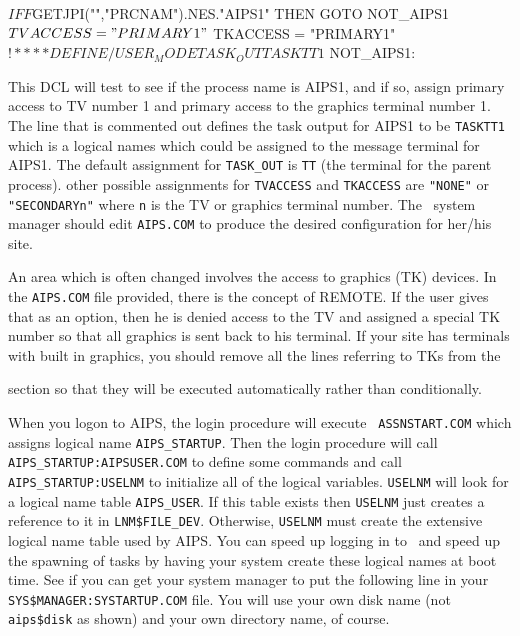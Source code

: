 \fortran
$ IF F$GETJPI("","PRCNAM").NES."AIPS1" THEN GOTO NOT_AIPS1
$     TVACCESS = "PRIMARY1"
$     TKACCESS = "PRIMARY1"
$!****     DEFINE/USER_MODE TASK_OUT TASKTT1
$ NOT_AIPS1:
\endfortran\medskip

\noindent
This DCL will test to see if the process name is AIPS1, and if so,
assign primary access to TV number 1 and primary access to the
graphics terminal number 1.  The line that is commented out defines
the task output for AIPS1 to be {\tt TASKTT1} which is a logical names
which could be assigned to the message terminal for AIPS1.  The
default assignment for {\tt TASK\_OUT} is {\tt TT} (the terminal for
the parent process). other possible assignments for {\tt TVACCESS} and
{\tt TKACCESS} are {\tt "NONE"} or {\tt "SECONDARYn"} where {\tt n} is
the TV or graphics terminal number.  The \aips\ system manager should
edit {\tt AIPS.COM} to produce the desired configuration for her/his site.

An area which is often changed involves the access to graphics (TK)
devices.  In the {\tt AIPS.COM} file provided, there is the concept of
REMOTE.  If the user gives that as an option, then he is denied access
to the TV and assigned a special TK number so that all graphics is sent
back to his terminal.  If your site has terminals with built in
graphics, you should remove all the lines referring to TKs from the\medskip

\medskip

\noindent
section so that they will be executed automatically rather than
conditionally.

\medskip{}

When you logon to AIPS, the login procedure will execute {\tt
ASSNSTART.COM} which assigns logical name {\tt AIPS\_STARTUP}.  Then
the login procedure will call {\tt AIPS\_STARTUP:AIPS\-USER\-.COM} to
define some commands and call {\tt AIPS\_STARTUP:USELNM} to initialize
all of the logical variables.  {\tt USELNM} will look for a logical
name table {\tt AIPS\_USER}.  If this table exists then {\tt USELNM}
just creates a reference to it in {\tt LNM\$FILE\_DEV}.  Otherwise,
{\tt USELNM} must create the extensive logical name table used by
AIPS.  You can speed up logging in to \aips\ and speed up the spawning
of tasks by having your system create these logical names at boot
time.  See if you can get your system manager to put the following
line in your {\tt SYS\$MANAGER:SYSTARTUP.COM} file.  You will use your own
disk name (not {\tt aips\$disk} as shown) and your own directory name, of
course.\medskip

